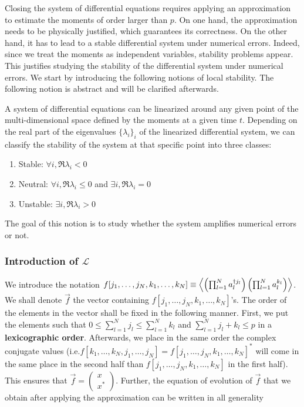 Closing the system of differential equations requires applying an approximation to estimate the moments of order larger than $p$. On one hand, the approximation needs to be physically justified, which guarantees its correctness. On the other hand, it has to lead to a stable differential system under numerical errors. Indeed, since we treat the moments as independent variables, stability problems appear. This justifies studying the stability of the differential system under numerical errors. We start by introducing the following notions of local stability. The following notion is abstract and will be clarified afterwards.

\begin{definition}
    A system of differential equations can be linearized around any given point of the multi-dimensional space defined by the moments at a given time $t$. Depending on the real part of the eigenvalues $\{\lambda_i\}_i$ of the linearized differential system, we can classify the stability of the system at that specific point into three classes:
    \begin{enumerate}
        \item Stable: $\forall i, \Re{\lambda_i} < 0$
        \item Neutral: $\forall i, \Re{\lambda_i} \le 0$ and $\exists i, \Re{\lambda_i} = 0$
        \item Unstable: $\exists i, \Re{\lambda_i} > 0$
    \end{enumerate}
    The goal of this notion is to study whether the system amplifies numerical errors or not.
\end{definition}

\subsubsection{Introduction of $\mathcal{L}$}

We introduce the notation $f[j_1, \ldots, j_N, k_1, \ldots, k_N] \equiv \left\langle \left(\prod_{l=1}^N a^{\dagger j_l}_l\right) \left(\prod_{l=1}^N a^{k_l}_l\right) \right\rangle$. We shall denote $\Vec{f}$ the vector containing $f[j_1, \ldots, j_N, k_1, \ldots, k_N]$'s. The order of the elements in the vector shall be fixed in the following manner. First, we put the elements such that $0 \le \sum_{l = 1}^N j_l \le \sum_{l = 1}^N k_l$ and $\sum_{l = 1}^N j_l + k_l \le p$ in a \textbf{lexicographic order}. Afterwards, we place in the same order the complex conjugate values (i.e.\@ $f[k_1, \ldots, k_N, j_1, \ldots, j_N] = f[j_1, \ldots, j_N, k_1, \ldots, k_N]^*$ will come in the same place in the second half than $f[j_1, \ldots, j_N, k_1, \ldots, k_N]$ in the first half). This ensures that $\Vec{f} = \begin{pmatrix}
    x\\
    x^*
\end{pmatrix}$. Further, the equation of evolution of $\Vec{f}$ that we obtain after applying the approximation can be written in all generality

